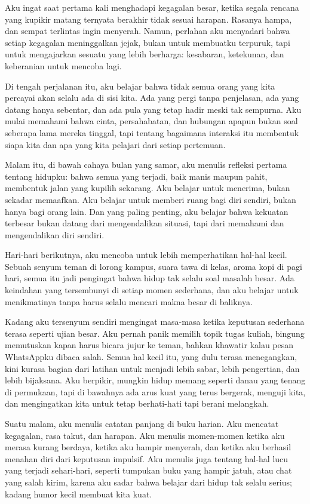 \documentclass[
  letterpaper,
  DIV=11,
  numbers=noendperiod]{scrreprt}
\begin{document}
Aku ingat saat pertama kali menghadapi kegagalan besar, ketika segala
rencana yang kupikir matang ternyata berakhir tidak sesuai harapan.
Rasanya hampa, dan sempat terlintas ingin menyerah. Namun, perlahan aku
menyadari bahwa setiap kegagalan meninggalkan jejak, bukan untuk
membuatku terpuruk, tapi untuk mengajarkan sesuatu yang lebih berharga:
kesabaran, ketekunan, dan keberanian untuk mencoba lagi.

Di tengah perjalanan itu, aku belajar bahwa tidak semua orang yang kita
percayai akan selalu ada di sisi kita. Ada yang pergi tanpa penjelasan,
ada yang datang hanya sebentar, dan ada pula yang tetap hadir meski tak
sempurna. Aku mulai memahami bahwa cinta, persahabatan, dan hubungan
apapun bukan soal seberapa lama mereka tinggal, tapi tentang bagaimana
interaksi itu membentuk siapa kita dan apa yang kita pelajari dari
setiap pertemuan.

Malam itu, di bawah cahaya bulan yang samar, aku menulis refleksi
pertama tentang hidupku: bahwa semua yang terjadi, baik manis maupun
pahit, membentuk jalan yang kupilih sekarang. Aku belajar untuk
menerima, bukan sekadar memaafkan. Aku belajar untuk memberi ruang bagi
diri sendiri, bukan hanya bagi orang lain. Dan yang paling penting, aku
belajar bahwa kekuatan terbesar bukan datang dari mengendalikan situasi,
tapi dari memahami dan mengendalikan diri sendiri.

Hari-hari berikutnya, aku mencoba untuk lebih memperhatikan hal-hal
kecil. Sebuah senyum teman di lorong kampus, suara tawa di kelas, aroma
kopi di pagi hari, semua itu jadi pengingat bahwa hidup tak selalu soal
masalah besar. Ada keindahan yang tersembunyi di setiap momen sederhana,
dan aku belajar untuk menikmatinya tanpa harus selalu mencari makna
besar di baliknya.

Kadang aku tersenyum sendiri mengingat masa-masa ketika keputusan
sederhana terasa seperti ujian besar. Aku pernah panik memilih topik
tugas kuliah, bingung memutuskan kapan harus bicara jujur ke teman,
bahkan khawatir kalau pesan WhatsAppku dibaca salah. Semua hal kecil
itu, yang dulu terasa menegangkan, kini kurasa bagian dari latihan untuk
menjadi lebih sabar, lebih pengertian, dan lebih bijaksana. Aku
berpikir, mungkin hidup memang seperti danau yang tenang di permukaan,
tapi di bawahnya ada arus kuat yang terus bergerak, menguji kita, dan
mengingatkan kita untuk tetap berhati-hati tapi berani melangkah.

Suatu malam, aku menulis catatan panjang di buku harian. Aku mencatat
kegagalan, rasa takut, dan harapan. Aku menulis momen-momen ketika aku
merasa kurang berdaya, ketika aku hampir menyerah, dan ketika aku
berhasil menahan diri dari keputusan impulsif. Aku menulis juga tentang
hal-hal lucu yang terjadi sehari-hari, seperti tumpukan buku yang hampir
jatuh, atau chat yang salah kirim, karena aku sadar bahwa belajar dari
hidup tak selalu serius; kadang humor kecil membuat kita kuat.
\end{document}
